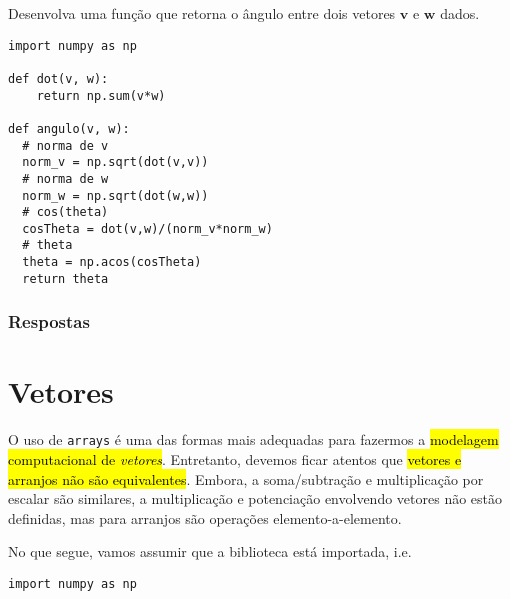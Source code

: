 \begin{exer}
  Desenvolva uma função que retorna o ângulo entre dois vetores $\pmb{v}$ e $\pmb{w}$ dados.
\end{exer}
\begin{resp}

\begin{lstlisting}
import numpy as np

def dot(v, w):
    return np.sum(v*w)

def angulo(v, w):
  # norma de v
  norm_v = np.sqrt(dot(v,v))
  # norma de w
  norm_w = np.sqrt(dot(w,w))
  # cos(theta)
  cosTheta = dot(v,w)/(norm_v*norm_w)
  # theta
  theta = np.acos(cosTheta)
  return theta
\end{lstlisting}

\end{resp}

\ifisbook
\subsubsection{Respostas}
\shipoutAnswer
\fi


\section{Vetores}\label{cap_arr_sec_vetor}

O uso de \texttt{arrays} é uma das formas mais adequadas para fazermos a \hl{modelagem computacional de \emph{vetores}}. Entretanto, devemos ficar atentos que \hl{vetores e arranjos não são equivalentes}. Embora, a soma/subtração e multiplicação por escalar são similares, a multiplicação e potenciação envolvendo vetores não estão definidas, mas para arranjos são operações elemento-a-elemento.

No que segue, vamos assumir que a biblioteca {\numpy} está importada, i.e.

\begin{lstlisting}
import numpy as np
\end{lstlisting}

